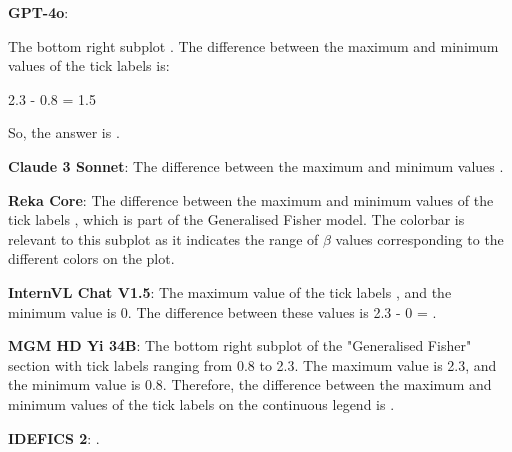 \begin{wronganswer}
\textbf{GPT-4o}: \small{The bottom right subplot . The difference between the maximum and minimum values of the tick labels is:

2.3 - 0.8 = 1.5

So, the answer is .}
\end{wronganswer}

\begin{wronganswer}
\textbf{Claude 3 Sonnet}: \small{The difference between the maximum and minimum values .}
\end{wronganswer}

\begin{wronganswer}
\textbf{Reka Core}: \small{ The difference between the maximum and minimum values of the tick labels , which is part of the Generalised Fisher model. The colorbar is relevant to this subplot as it indicates the range of $\beta$ values corresponding to the different colors on the plot.}
\end{wronganswer}

\begin{wronganswer}
\textbf{InternVL Chat V1.5}: \small{The maximum value of the tick labels , and the minimum value is 0. The difference between these values is 2.3 - 0 = .}
\end{wronganswer}

\begin{wronganswer}
\textbf{MGM HD Yi 34B}: \small{The bottom right subplot of the "Generalised Fisher" section  with tick labels ranging from 0.8 to 2.3. The maximum value is 2.3, and the minimum value is 0.8. Therefore, the difference between the maximum and minimum values of the tick labels on the continuous legend is .}
\end{wronganswer}

\begin{wronganswer}
\textbf{IDEFICS 2}: \small{.}
\end{wronganswer}
\newpage
